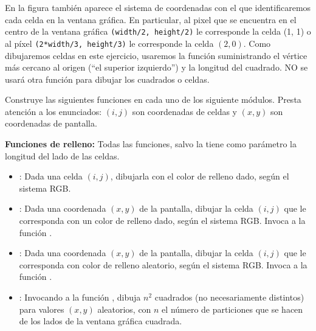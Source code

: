 En la figura también aparece el sistema de coordenadas con el que identificaremos cada celda en la ventana gráfica. En particular, al pixel que se encuentra en el centro de la ventana gráfica {\tt (width/2, height/2)} le corresponde la celda (1, 1) o al píxel  {\tt (2*width/3, height/3)}  le corresponde la celda $(2,0)$.  Como dibujaremos celdas en este ejercicio, usaremos la función  suministrando el vértice más cercano al origen (``el superior izquierdo'') y la longitud del cuadrado. NO se usará otra función para dibujar los cuadrados o celdas.

\noindent Construye las siguientes funciones en cada uno de los siguiente módulos. Presta atención a los enunciados: $(i, j)$ son coordenadas de celdas y $(x, y)$ son coordenadas de pantalla.

{\bf Funciones de relleno:} Todas las funciones, salvo la  tiene como parámetro la longitud del lado de las celdas.
\begin{itemize}
\item {}: Dada una celda $(i, j)$, dibujarla con el color de relleno dado, según el sistema RGB.

\item {}: Dada una coordenada $(x, y)$ de la pantalla, dibujar la celda $(i, j)$ que le corresponda con un color de relleno dado, según el sistema RGB. Invoca a la función .

\item {}: Dada una coordenada $(x, y)$ de la pantalla, dibujar la celda $(i, j)$ que le corresponda con color de relleno aleatorio, según el sistema RGB.  Invoca a la función .

\item {}: Invocando a la función , dibuja $n^2$ cuadrados (no necesariamente distintos) para valores $(x, y)$ aleatorios, con $n$ el número de particiones que se hacen de los lados de la ventana gráfica cuadrada.
\end{itemize}


